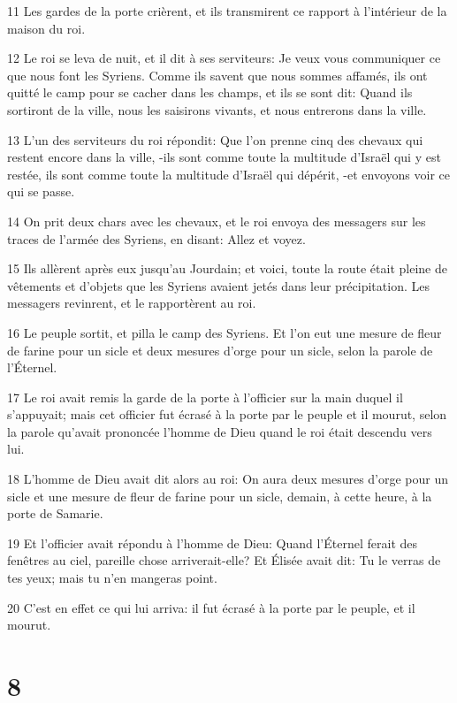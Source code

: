 \par 11 Les gardes de la porte crièrent, et ils transmirent ce rapport à l'intérieur de la maison du roi.
\par 12 Le roi se leva de nuit, et il dit à ses serviteurs: Je veux vous communiquer ce que nous font les Syriens. Comme ils savent que nous sommes affamés, ils ont quitté le camp pour se cacher dans les champs, et ils se sont dit: Quand ils sortiront de la ville, nous les saisirons vivants, et nous entrerons dans la ville.
\par 13 L'un des serviteurs du roi répondit: Que l'on prenne cinq des chevaux qui restent encore dans la ville, -ils sont comme toute la multitude d'Israël qui y est restée, ils sont comme toute la multitude d'Israël qui dépérit, -et envoyons voir ce qui se passe.
\par 14 On prit deux chars avec les chevaux, et le roi envoya des messagers sur les traces de l'armée des Syriens, en disant: Allez et voyez.
\par 15 Ils allèrent après eux jusqu'au Jourdain; et voici, toute la route était pleine de vêtements et d'objets que les Syriens avaient jetés dans leur précipitation. Les messagers revinrent, et le rapportèrent au roi.
\par 16 Le peuple sortit, et pilla le camp des Syriens. Et l'on eut une mesure de fleur de farine pour un sicle et deux mesures d'orge pour un sicle, selon la parole de l'Éternel.
\par 17 Le roi avait remis la garde de la porte à l'officier sur la main duquel il s'appuyait; mais cet officier fut écrasé à la porte par le peuple et il mourut, selon la parole qu'avait prononcée l'homme de Dieu quand le roi était descendu vers lui.
\par 18 L'homme de Dieu avait dit alors au roi: On aura deux mesures d'orge pour un sicle et une mesure de fleur de farine pour un sicle, demain, à cette heure, à la porte de Samarie.
\par 19 Et l'officier avait répondu à l'homme de Dieu: Quand l'Éternel ferait des fenêtres au ciel, pareille chose arriverait-elle? Et Élisée avait dit: Tu le verras de tes yeux; mais tu n'en mangeras point.
\par 20 C'est en effet ce qui lui arriva: il fut écrasé à la porte par le peuple, et il mourut.

\chapter{8}

